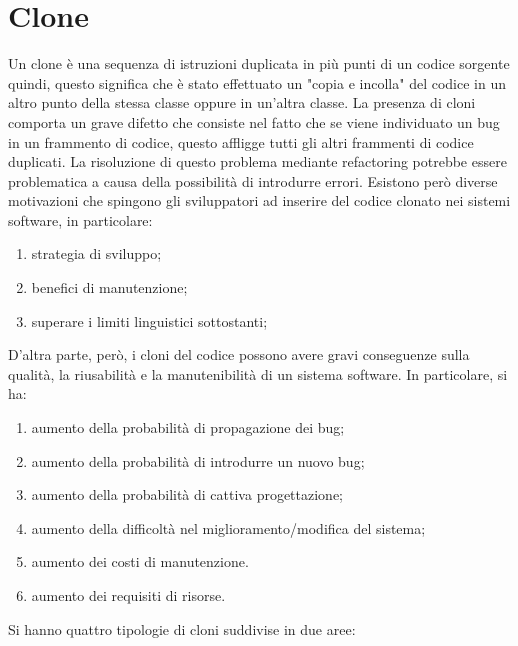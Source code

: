 \section{Clone}
Un clone è una sequenza di istruzioni duplicata in più punti di un codice sorgente quindi, questo significa che è stato effettuato un "copia e incolla" del codice in un altro punto della stessa classe oppure in un'altra classe. La presenza di cloni comporta un grave difetto che consiste nel fatto che se viene individuato un bug in un frammento di codice, questo affligge tutti gli altri frammenti di codice duplicati. La risoluzione di questo problema mediante refactoring potrebbe essere problematica a causa della possibilità di introdurre errori. Esistono però diverse motivazioni che spingono gli sviluppatori ad inserire del codice clonato nei sistemi software, in particolare:
\begin{enumerate}
\item	strategia di sviluppo;
\item	benefici di manutenzione;
\item	superare i limiti linguistici sottostanti;
\end{enumerate}
D'altra parte, però, i cloni del codice possono avere gravi conseguenze sulla qualità, la riusabilità e la manutenibilità di un sistema software. In particolare, si ha:
\begin{enumerate}
\item	aumento della probabilità di propagazione dei bug;
\item	aumento della probabilità di introdurre un nuovo bug;
\item	aumento della probabilità di cattiva progettazione;
\item	aumento della difficoltà nel miglioramento/modifica del sistema;
\item	aumento dei costi di manutenzione.
\item	aumento dei requisiti di risorse.
\end{enumerate}
Si hanno quattro tipologie di cloni suddivise in due aree:
